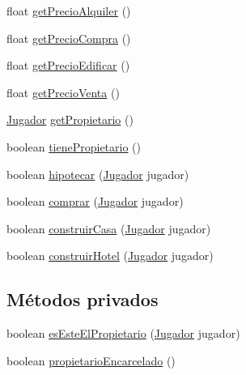 \begin{DoxyCompactItemize}
float \hyperlink{classcivitas_1_1TituloPropiedad_aa79c195a743544d869254bdd9e327c18}{get\+Precio\+Alquiler} ()
\item 
float \hyperlink{classcivitas_1_1TituloPropiedad_aa4a37b3b373b67bf57de4ff9c052e2cc}{get\+Precio\+Compra} ()
\item 
float \hyperlink{classcivitas_1_1TituloPropiedad_aa5ebf334114985e75d4c293107a3367f}{get\+Precio\+Edificar} ()
\item 
float \hyperlink{classcivitas_1_1TituloPropiedad_a1730fca9c95b2c3d538fbd63113085c7}{get\+Precio\+Venta} ()
\item 
\hyperlink{classcivitas_1_1Jugador}{Jugador} \hyperlink{classcivitas_1_1TituloPropiedad_ae109616f7c5c37f25ab42be9afd77324}{get\+Propietario} ()
\item 
boolean \hyperlink{classcivitas_1_1TituloPropiedad_a022213f4811b8a990632665137752415}{tiene\+Propietario} ()
\item 
boolean \hyperlink{classcivitas_1_1TituloPropiedad_ae09a294437e56818a913612ec6f835ed}{hipotecar} (\hyperlink{classcivitas_1_1Jugador}{Jugador} jugador)
\item 
boolean \hyperlink{classcivitas_1_1TituloPropiedad_a4facb90267225f5e279424e679e5ac8d}{comprar} (\hyperlink{classcivitas_1_1Jugador}{Jugador} jugador)
\item 
boolean \hyperlink{classcivitas_1_1TituloPropiedad_a3a335481d7f8cb2c675746d9e87f9b1b}{construir\+Casa} (\hyperlink{classcivitas_1_1Jugador}{Jugador} jugador)
\item 
boolean \hyperlink{classcivitas_1_1TituloPropiedad_a037ce8da6a29efc2001bb800297b80a5}{construir\+Hotel} (\hyperlink{classcivitas_1_1Jugador}{Jugador} jugador)
\end{DoxyCompactItemize}
\subsection*{Métodos privados}
\begin{DoxyCompactItemize}
\item 
boolean \hyperlink{classcivitas_1_1TituloPropiedad_a90576263833e66db28713a4e5cc19a62}{es\+Este\+El\+Propietario} (\hyperlink{classcivitas_1_1Jugador}{Jugador} jugador)
\item 
boolean \hyperlink{classcivitas_1_1TituloPropiedad_ad46ff96f913a38c805c938a15f307cf7}{propietario\+Encarcelado} ()
\end{DoxyCompactItemize}
